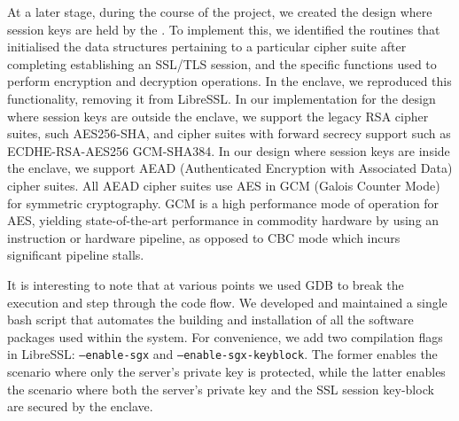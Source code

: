 \documentclass[../main.tex]{subfiles}
\begin{document}
At a later stage, during the course of the project, we created the
design where session keys are held by the \enclaveprogram. To
implement this, we identified the routines that initialised the data
structures pertaining to a particular cipher suite after completing
establishing an SSL/TLS session, and the specific functions used to
perform encryption and decryption operations. In the enclave, we
reproduced this functionality, removing it from LibreSSL. In our
implementation for the design where session keys are outside the
enclave, we support the legacy RSA cipher suites, such AES256-SHA, and
cipher suites with forward secrecy support such as ECDHE-RSA-AES256
GCM-SHA384. In our design where session keys are inside the enclave,
we support AEAD (Authenticated Encryption with Associated Data) cipher
suites. All AEAD cipher suites use AES in GCM (Galois Counter Mode)
for symmetric cryptography. GCM is a high performance mode of
operation for AES, yielding state-of-the-art performance in commodity
hardware by using an instruction or hardware pipeline, as opposed to
CBC mode which incurs significant pipeline stalls.

It is interesting to note that at various points we used GDB to break
the execution and step through the code flow. We developed and
maintained a single bash script that automates the building and
installation of all the software packages used within the system. For
convenience, we add two compilation flags in LibreSSL:
\texttt{--enable-sgx} and \texttt{--enable-sgx-keyblock}. The former
enables the scenario where only the server's private key is protected,
while the latter enables the scenario where both the server's private
key and the SSL session key-block are secured by the enclave.
\end{document}
